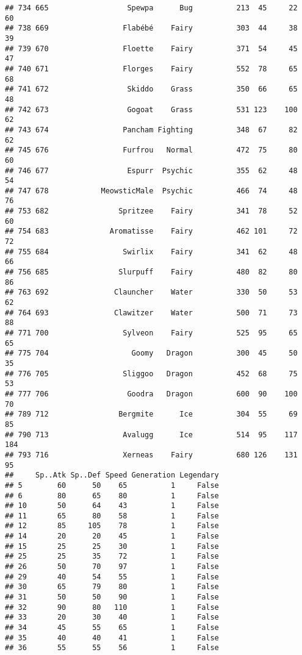 \documentclass[
]{article}
\begin{document}
\begin{verbatim}
## 734 665                  Spewpa      Bug          213  45     22      60
## 738 669                 Flabébé    Fairy          303  44     38      39
## 739 670                 Floette    Fairy          371  54     45      47
## 740 671                 Florges    Fairy          552  78     65      68
## 741 672                  Skiddo    Grass          350  66     65      48
## 742 673                  Gogoat    Grass          531 123    100      62
## 743 674                 Pancham Fighting          348  67     82      62
## 745 676                 Furfrou   Normal          472  75     80      60
## 746 677                  Espurr  Psychic          355  62     48      54
## 747 678            MeowsticMale  Psychic          466  74     48      76
## 753 682                Spritzee    Fairy          341  78     52      60
## 754 683              Aromatisse    Fairy          462 101     72      72
## 755 684                 Swirlix    Fairy          341  62     48      66
## 756 685                Slurpuff    Fairy          480  82     80      86
## 763 692               Clauncher    Water          330  50     53      62
## 764 693               Clawitzer    Water          500  71     73      88
## 771 700                 Sylveon    Fairy          525  95     65      65
## 775 704                   Goomy   Dragon          300  45     50      35
## 776 705                 Sliggoo   Dragon          452  68     75      53
## 777 706                  Goodra   Dragon          600  90    100      70
## 789 712                Bergmite      Ice          304  55     69      85
## 790 713                 Avalugg      Ice          514  95    117     184
## 793 716                 Xerneas    Fairy          680 126    131      95
##     Sp..Atk Sp..Def Speed Generation Legendary
## 5        60      50    65          1     False
## 6        80      65    80          1     False
## 10       50      64    43          1     False
## 11       65      80    58          1     False
## 12       85     105    78          1     False
## 14       20      20    45          1     False
## 15       25      25    30          1     False
## 25       25      35    72          1     False
## 26       50      70    97          1     False
## 29       40      54    55          1     False
## 30       65      79    80          1     False
## 31       50      50    90          1     False
## 32       90      80   110          1     False
## 33       20      30    40          1     False
## 34       45      55    65          1     False
## 35       40      40    41          1     False
## 36       55      55    56          1     False

\end{verbatim}
\end{document}
